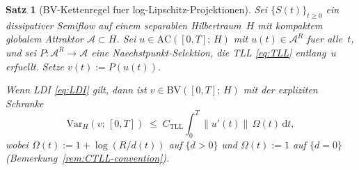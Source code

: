 \documentclass[12pt,a4paper]{article}
\theoremstyle{definition}
\theoremstyle{plain}
\newtheorem{theorem}[definition]{Satz}
\theoremstyle{remark}
\newcommand{\Var}{\mathrm{Var}}
\newcommand{\AC}{\mathrm{AC}}
\newcommand{\BV}{\mathrm{BV}}
\begin{document}
\begin{theorem}[BV-Kettenregel fuer log-Lipschitz-Projektionen]
\label{thm:BV-chain}
Sei $\{S(t)\}_{t \ge 0}$ ein dissipativer Semiflow auf einem
separablen Hilbertraum~$H$ mit kompaktem globalem Attraktor
$\mathcal{A} \subset H$.  Sei $u \in \AC([0,T];\, H)$ mit
$u(t) \in \mathcal{A}^R$ fuer alle~$t$, und sei
$P: \mathcal{A}^R \to \mathcal{A}$ eine Naechstpunkt-Selektion,
die TLL \eqref{eq:TLL} entlang~$u$ erfuellt.  Setze $v(t) := P(u(t))$.

Wenn LDI \eqref{eq:LDI} gilt, dann ist
$v \in \BV([0,T];\, H)$ mit der expliziten Schranke
\begin{equation}\label{eq:BV-bound}
  \Var_H(v;\,[0,T])
  \;\le\;
  C_{\mathrm{TLL}}
  \int_0^T \|u'(t)\|\,\Omega(t)\,\mathrm{d}t,
\end{equation}
wobei $\Omega(t) := 1 + \log(R/d(t))$ auf $\{d > 0\}$ und
$\Omega(t) := 1$ auf $\{d = 0\}$
(Bemerkung~\ref{rem:CTLL-convention}).
\end{theorem}
\end{document}
